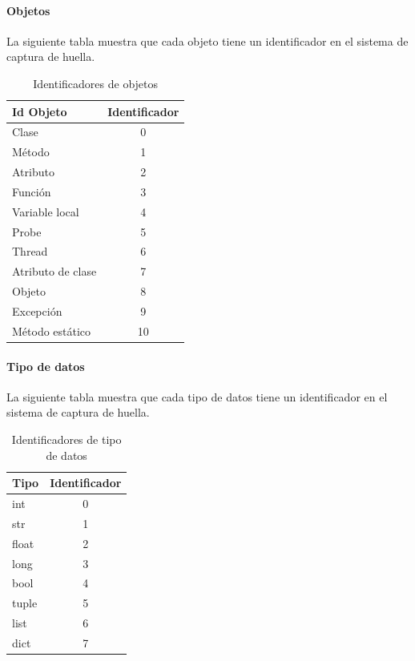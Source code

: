 \documentclass[12pt,legalpaper]{report}
\begin{document}
				\paragraph{Objetos}
La siguiente tabla muestra que cada objeto tiene un identificador en el sistema de captura de huella.


\begin{table}[!h]
\begin{center}
\begin{tabular}{| l | c |}
\hline
\rowcolor[gray]{0.9}Id Objeto & Identificador\\
\hline
Clase & 0\\
\hline
Método & 1\\
\hline
Atributo & 2\\
\hline
Función & 3\\
\hline
Variable local & 4\\
\hline
Probe & 5\\
\hline
Thread & 6\\
\hline
Atributo de clase & 7\\
\hline
Objeto & 8\\
\hline
Excepción & 9\\
\hline
Método estático & 10\\
\hline 
\end{tabular}
\caption{Identificadores de objetos} 
\end{center}
\end{table}


				\paragraph{Tipo de datos}
La siguiente tabla muestra que cada tipo de datos tiene un identificador en el sistema de captura de huella.
\begin{table}[!h]
\begin{center}
\begin{tabular}{|l | c |}
\hline
\rowcolor[gray]{0.9}Tipo & Identificador\\
\hline
int & 0\\
\hline
str & 1\\
\hline
float & 2\\
\hline
long & 3\\
\hline
bool & 4\\
\hline
tuple & 5\\
\hline
list & 6\\
\hline
dict & 7\\
\hline
\end{tabular}
\caption{Identificadores de tipo de datos} 
\end{center}
\end{table}
\end{document}
